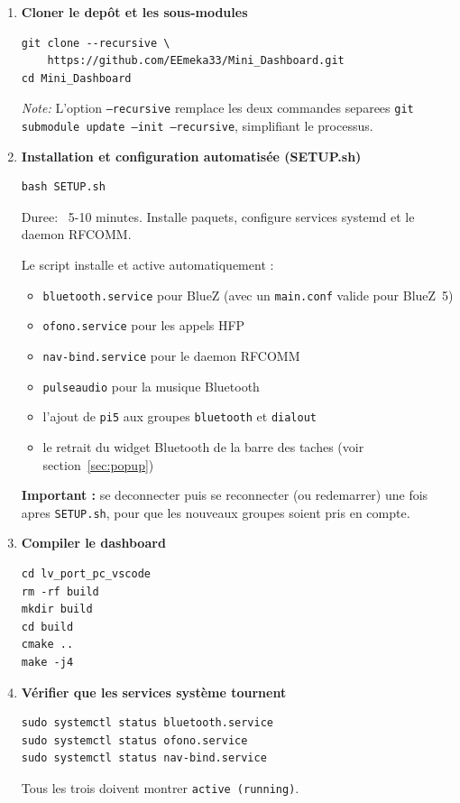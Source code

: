 \documentclass[a4paper,11pt]{article}
\begin{document}
\begin{enumerate}
  \item \textbf{Cloner le depôt et les sous-modules}
  \begin{lstlisting}[style=bashcode]
git clone --recursive \
    https://github.com/EEmeka33/Mini_Dashboard.git
cd Mini_Dashboard
  \end{lstlisting}
  \emph{Note:} L'option \texttt{--recursive} remplace les deux commandes separees
  \texttt{git submodule update --init --recursive}, simplifiant le processus.

  \item \textbf{Installation et configuration automatisée (SETUP.sh)}
  \begin{lstlisting}[style=bashcode]
bash SETUP.sh
  \end{lstlisting}
  Duree: ~5-10 minutes. Installe paquets, configure services systemd et le daemon RFCOMM.

  Le script installe et active automatiquement :
\begin{itemize}
    \item \texttt{bluetooth.service} pour BlueZ (avec un \texttt{main.conf} valide pour BlueZ~5)
    \item \texttt{ofono.service} pour les appels HFP
    \item \texttt{nav-bind.service} pour le daemon RFCOMM
    \item \texttt{pulseaudio} pour la musique Bluetooth
    \item l'ajout de \texttt{pi5} aux groupes \texttt{bluetooth} et \texttt{dialout}
    \item le retrait du widget Bluetooth de la barre des taches (voir section~\ref{sec:popup})
\end{itemize}

  \textbf{Important :} se deconnecter puis se reconnecter (ou redemarrer) une fois apres
  \texttt{SETUP.sh}, pour que les nouveaux groupes soient pris en compte.

  \item \textbf{Compiler le dashboard}
  \begin{lstlisting}[style=bashcode]
cd lv_port_pc_vscode
rm -rf build
mkdir build
cd build
cmake ..
make -j4
  \end{lstlisting}

  \item \textbf{Vérifier que les services système tournent}
  \begin{lstlisting}[style=bashcode]
sudo systemctl status bluetooth.service
sudo systemctl status ofono.service
sudo systemctl status nav-bind.service
  \end{lstlisting}
  Tous les trois doivent montrer \texttt{active (running)}.


\end{enumerate}
\end{document}
